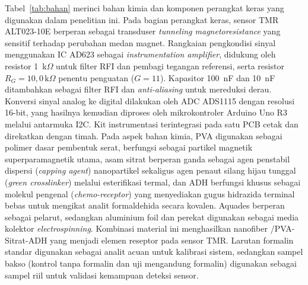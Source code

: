 Tabel~\ref{tab:bahan} merinci bahan kimia dan komponen perangkat keras yang digunakan dalam penelitian ini. Pada bagian perangkat keras, sensor TMR ALT023-10E berperan sebagai transduser \textit{tunneling magnetoresistance} yang sensitif terhadap perubahan medan magnet. Rangkaian pengkondisi sinyal menggunakan IC AD623 sebagai \textit{instrumentation amplifier}, didukung oleh resistor 1~k$\Omega$ untuk filter RFI dan pembagi tegangan referensi, serta resistor $R_G = 10{,}0\,\text{k}\Omega$ penentu penguatan ($G = 11$). Kapasitor 100~nF dan 10~nF ditambahkan sebagai filter RFI dan \textit{anti-aliasing} untuk mereduksi derau. Konversi sinyal analog ke digital dilakukan oleh ADC ADS1115 dengan resolusi 16-bit, yang hasilnya kemudian diproses oleh mikrokontroler Arduino Uno R3 melalui antarmuka I2C. Kit instrumentasi terintegrasi pada satu PCB cetak dan direkatkan dengan timah. Pada aspek bahan kimia, PVA digunakan sebagai polimer dasar pembentuk serat,  berfungsi sebagai partikel magnetik superparamagnetik utama, asam sitrat berperan ganda sebagai agen penstabil dispersi (\textit{capping agent}) nanopartikel sekaligus agen penaut silang hijau tunggal (\textit{green crosslinker}) melalui esterifikasi termal, dan ADH berfungsi khusus sebagai molekul pengenal (\textit{chemo-receptor}) yang menyediakan gugus hidrazida terminal bebas untuk mengikat analit formaldehida secara kovalen. Aquades berperan sebagai pelarut, sedangkan aluminium foil dan perekat digunakan sebagai media kolektor \textit{electrospinning}. Kombinasi material ini menghasilkan nanofiber /PVA-Sitrat-ADH yang menjadi elemen reseptor pada sensor TMR. Larutan formalin standar digunakan sebagai analit acuan untuk kalibrasi sistem, sedangkan sampel bakso (kontrol tanpa formalin dan uji mengandung formalin) digunakan sebagai sampel riil untuk validasi kemampuan deteksi sensor.

